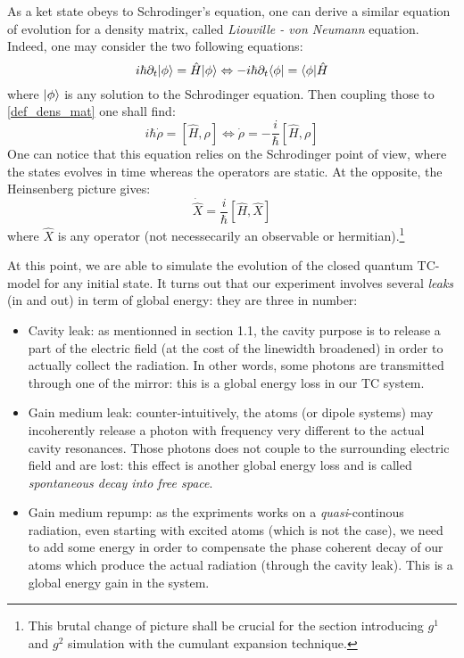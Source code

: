 \documentclass[12pt]{report}
\DeclarePairedDelimiter\bra{\langle}{\rvert}
\DeclarePairedDelimiter\ket{\lvert}{\rangle}
\begin{document}
As a ket state obeys to Schrodinger's equation, one can derive a similar equation of evolution for a density matrix, called \textit{Liouville - von Neumann} equation. Indeed, one may consider the two following equations:
\begin{equation}
i\hbar\partial _t\ket{\phi} = \hat{H}\ket{\phi} \Leftrightarrow -i\hbar\partial _t\bra{\phi} = \bra{\phi}\hat{H}
\end{equation}
where $\ket{\phi}$ is any solution to the Schrodinger equation. Then coupling those to \eqref{def_dens_mat} one shall find:
\begin{equation}
\label{vonneuman}
i\hbar\dot{\rho} = \left[ \hat{H}, \rho \right] \Leftrightarrow \dot{\rho} = -\frac{i}{\hbar} \left[ \hat{H}, \rho \right]
\end{equation}
One can notice that this equation relies on the Schrodinger point of view, where the states evolves in time whereas the operators are static. At the opposite, the Heinsenberg picture gives:
\begin{equation}
\dot{\hat{X}} = \frac{i}{\hbar} \left[ \hat{H}, \hat{X} \right]
\end{equation}
where $\hat{X}$ is any operator (not necessecarily an observable or hermitian).\footnote{This brutal change of picture shall be crucial for the section introducing $g^1$ and $g^2$ simulation with the cumulant expansion technique.}

At this point, we are able to simulate the evolution of the closed quantum TC-model for any initial state. It turns out that our experiment involves several \textit{leaks} (in and out) in term of global energy: they are three in number:
\begin{itemize}
	\item Cavity leak: as mentionned in section 1.1, the cavity purpose is to release a part of the electric field (at the cost of the linewidth broadened) in order to actually collect the radiation. In other words, some photons are transmitted through one of the mirror: this is a global energy loss in our TC system.
	\item Gain medium leak: counter-intuitively, the atoms (or dipole systems) may incoherently release a photon with frequency very different to the actual cavity resonances. Those photons does not couple to the surrounding electric field and are lost: this effect is another global energy loss and is called \textit{spontaneous decay into free space}.
	\item Gain medium repump: as the expriments works on a \textit{quasi}-continous radiation, even starting with excited atoms (which is not the case), we need to add some energy in order to compensate the phase coherent decay of our atoms which produce the actual radiation (through the cavity leak). This is a global energy gain in the system.
\end{itemize}
\end{document}
